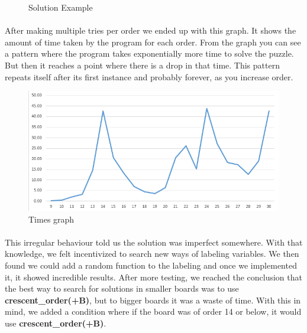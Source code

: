 \documentclass[runningheads]{llncs}
\begin{document}
\begin{figure}
\begin{center}
        \caption{Solution Example} \label{fig4}
    \end{center}
\end{figure}

\paragraph{}
After making multiple tries per order we ended up with this graph. It shows the amount of time taken by the program for
each order. From the graph you can see a pattern where the program takes exponentially more time to solve the puzzle. But then it
reaches a point where there is a drop in that time. This pattern repeats itself after its first instance and probably forever, as you increase order.

\begin{figure}
    \begin{center}
        \includegraphics[scale=0.6]{images/graph.png}
        \caption{Times graph} \label{fig5}
    \end{center}
\end{figure}

\paragraph{}
This irregular behaviour told us the solution was imperfect somewhere. With that knowledge, we felt incentivized to search new ways of labeling variables.
We then found we could add a random function to the labeling and once we implemented it, it showed incredible results. After more testing, we reached the conclusion
that the best way to search for solutions in smaller boards was to use \textbf{crescent\_order(+B)}, but to bigger boards it was a waste of time. With this in mind,
we added a condition where if the board was of order 14 or below, it would use \textbf{crescent\_order(+B)}.
\end{document}
